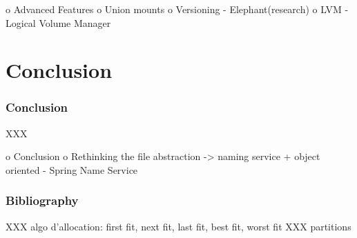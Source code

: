 o Advanced Features
 o Union mounts
 o Versioning
   - Elephant(research)
 o LVM - Logical Volume Manager

%
%

\section{Conclusion}


\begin{frame}
  \frametitle{Conclusion}

  XXX
\end{frame}

o Conclusion
 o Rethinking the file abstraction -> naming service + object oriented
   - Spring Name Service

%
%

\begin{frame}
  \frametitle{Bibliography}

  
  
\end{frame}



XXX algo d'allocation: first fit, next fit, last fit, best fit, worst fit
XXX partitions
